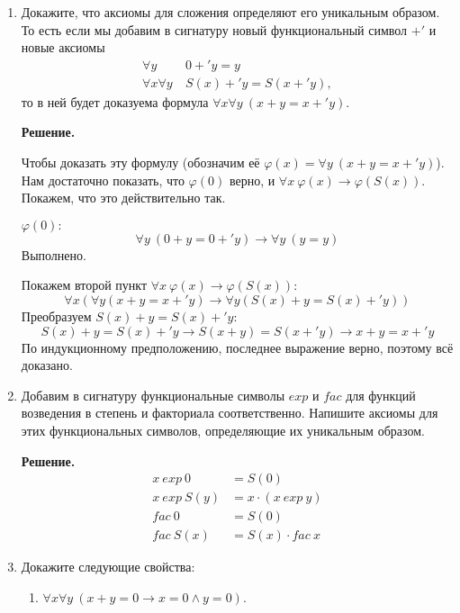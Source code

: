 \begin{enumerate}
\begin{itemize}
	
\end{itemize}

\item Докажите, что аксиомы для сложения определяют его уникальным образом.
    То есть если мы добавим в сигнатуру новый функциональный символ $+'$ и новые аксиомы
\begin{align*}
\forall y\ & 0 +' y = y \tag{$+'0$} \\
\forall x \forall y\ & S(x) +' y = S(x +' y) \tag{$+'S$},
\end{align*}
то в ней будет доказуема формула $\forall x \forall y\ (x + y = x +' y)$.

\textbf{Решение.} 

Чтобы доказать эту формулу (обозначим её $\varphi(x) = \forall y\ (x + y = x +' y)$). Нам достаточно показать, что $\varphi(0)$ верно, и $\forall x \ \varphi(x) \to \varphi(S(x))$. Покажем, что это действительно так.

$\varphi(0):$ 
\begin{equation*}
	\forall y \ (0 + y = 0 +' y) \to \forall y \ (y = y)
\end{equation*}
Выполнено.

Покажем второй пункт  $\forall x \ \varphi(x) \to \varphi(S(x))$:
\begin{equation*}
	\forall x (\forall y (x + y = x +' y) \to \forall y (S(x) + y = S(x) +' y))
\end{equation*}
Преобразуем $S(x) + y = S(x) +' y$:
\begin{equation*}
	S(x) + y = S(x) +' y \to S(x + y) = S(x +' y) \to x + y = x +' y
\end{equation*}
По индукционному предположению, последнее выражение верно, поэтому всё доказано.

\item Добавим в сигнатуру функциональные символы $exp$ и $fac$ для функций возведения в степень и факториала
соответственно.
    Напишите аксиомы для этих функциональных символов, определяющие их уникальным образом.

	\textbf{Решение.}
	\begin{align*}
		x \ exp \ 0 &= S(0)\\
		x \ exp \ S(y) &= x \cdot (x \ exp\ y) \\ 
		fac \ 0 &= S(0) \\
		fac \ S(x) &= S(x) \cdot fac\ x
	\end{align*}

\item Докажите следующие свойства:
\begin{enumerate}
\item $\forall x \forall y\ (x + y = 0 \to x = 0 \land y = 0)$.


\end{enumerate}
\end{enumerate}
